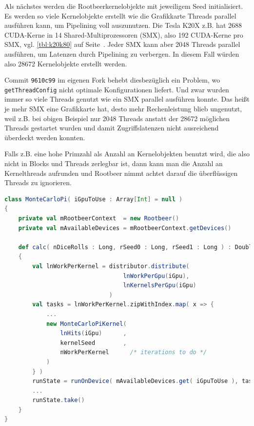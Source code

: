 Als nächstes werden die Rootbeerkernelobjekte mit jeweiligem Seed initialisiert. Es werden so viele Kernelobjekte erstellt wie die Grafikkarte Threads parallel ausführen kann, um Pipelining voll auszunutzen.
Die Tesla K20X z.B. hat 2688 CUDA-Kerne in 14 Shared-Multiprozessoren (SMX), also 192 CUDA-Kerne pro SMX, vgl. \autoref{tbl:k20k80} auf Seite~\pageref{tbl:k20k80}.
Jeder SMX kann aber 2048 Threads parallel ausführen, um Latenzen durch Pipelining zu verbergen. In diesem Fall würden also 28672 Kernelobjekte erstellt werden.

Commit \lstinline!9610c99! im eigenen Fork behebt diesbezüglich ein Problem, wo \lstinline!getThreadConfig! nicht optimale Konfigurationen liefert. Und zwar wurden immer so viele Threads genutzt wie ein SMX parallel ausführen konnte. Das heißt je mehr SMX eine Grafikkarte hat, desto mehr Rechenleistung blieb ungenutzt, weil z.B. bei obigen Beispiel nur 2048 Threads anstatt der 28672 möglichen Threads gestartet wurden und damit Zugriffslatenzen nicht ausreichend überdeckt werden konnten.

Falls z.B. eine hohe Primzahl als Anzahl an Kernelobjekten benutzt wird, die also nicht in Blocks und Threads zerlegbar ist, dann kann man die Anzahl an Kernelthreads aufrunden und Rootbeer nimmt achtet darauf die überflüssigen Threads zu ignorieren.

\begin{lstlisting}[language=scala,caption={Initialisierung der Rootbeerkernelobjekte, vgl. auch \lstinline!multiNode/multiGpu/scala/MonteCarloPi.scala! \cite{scaromare}},label=lst:kernelinit]
class MonteCarloPi( iGpuToUse : Array[Int] = null )
{
    private val mRootbeerContext  = new Rootbeer()
    private val mAvailableDevices = mRootbeerContext.getDevices()

    def calc( nDiceRolls : Long, rSeed0 : Long, rSeed1 : Long ) : Double =
    {
        val lnWorkPerKernel = distributor.distribute(
                                  lnWorkPerGpu(iGpu),
                                  lnKernelsPerGpu(iGpu)
                              )
        val tasks = lnWorkPerKernel.zipWithIndex.map( x => {
            ...
            new MonteCarloPiKernel(
                lnHits(iGpu)      ,
                kernelSeed        ,
                nWorkPerKernel      /* iterations to do */
            )
        } )
        runState = runOnDevice( mAvailableDevices.get( iGpuToUse ), tasks )
        ...
        runState.take()
    }
}
\end{lstlisting}


